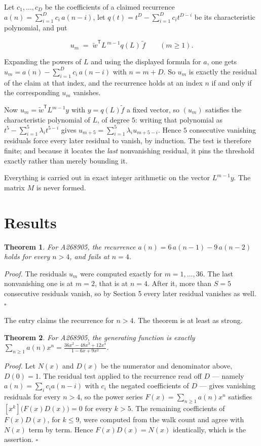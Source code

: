 \documentclass[11pt]{article}
\newtheorem{theorem}{Theorem}
\theoremstyle{definition}
\begin{document}
Let $c_1,\dots,c_D$ be the coefficients of a claimed recurrence $a(n) = \sum_{i=1}^{D} c_i\,a(n-i)$, let $q(t) = t^{D} - \sum_{i=1}^{D} c_i t^{D-i}$ be its characteristic polynomial, and put

\[u_m \;=\; \tilde w^{\mathsf T} L^{\,m-1} q(L)\,\tilde f \qquad (m \ge 1).\]

Expanding the powers of $L$ and using the displayed formula for $a$, one gets $u_m = a(n) - \sum_{i=1}^{D} c_i\,a(n-i)$ with $n = m + D$. So $u_m$ is exactly the residual of the claim at that index, and the recurrence holds at an index $n$ if and only if the corresponding $u_m$ vanishes.

Now $u_m = \tilde w^{\mathsf T} L^{m-1} y$ with $y = q(L)\tilde f$ a fixed vector, so $(u_m)$ satisfies the characteristic polynomial of $L$, of degree $5$: writing that polynomial as $t^{5} - \sum_{i=1}^{5} \lambda_i t^{5-i}$ gives $u_{m+5} = \sum_{i=1}^{5} \lambda_i u_{m+5-i}$. Hence $5$ consecutive vanishing residuals force every later residual to vanish, by induction. The test is therefore finite; and because it locates the {\itshape last} nonvanishing residual, it pins the threshold exactly rather than merely bounding it.

Everything is carried out in exact integer arithmetic on the vector $L^{m-1}y$. The matrix $M$ is never formed.

\section{Results}

\begin{theorem} For A268905, the recurrence $a(n) = 6\,a(n-1) - 9\,a(n-2)$ holds for every $n > 4$, and fails at $n = 4$.\end{theorem}

{\itshape Proof.} The residuals $u_m$ were computed exactly for $m = 1,\dots,36$. The last nonvanishing one is at $m = 2$, that is at $n = 4$. After it, more than $S = 5$ consecutive residuals vanish, so by Section 5 every later residual vanishes as well. $\square$

The entry claims the recurrence for $n > 4$. The theorem is at least as strong.

\begin{theorem} For A268905, the generating function is exactly $\sum_{n\ge 1} a(n)x^n = \frac{36x^{2} - 48x^{3} + 12x^{4}}{1 - 6x + 9x^{2}}$.\end{theorem}

{\itshape Proof.} Let $N(x)$ and $D(x)$ be the numerator and denominator above, $D(0)=1$. The residual test applied to the recurrence read off $D$ --- namely $a(n) = \sum_i c_i a(n-i)$ with $c_i$ the negated coefficients of $D$ --- gives vanishing residuals for every $n > 4$, so the power series $F(x)=\sum_{n\ge 1}a(n)x^n$ satisfies $[x^k]\bigl(F(x)D(x)\bigr) = 0$ for every $k > 5$. The remaining coefficients of $F(x)D(x)$, for $k \le 9$, were computed from the walk count and agree with $N(x)$ term by term. Hence $F(x)D(x) = N(x)$ identically, which is the assertion. $\square$
\end{document}
